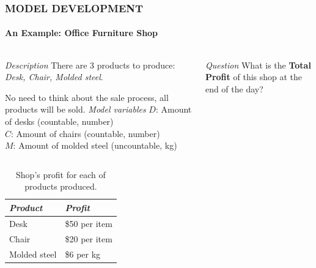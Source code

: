 \documentclass[14 pt]{beamer}
\begin{document}

\begin{frame}[t]
\frametitle{MODEL DEVELOPMENT}
\framesubtitle{An Example: Office Furniture Shop}

\begin{columns}[t]
\begin{column}{0.45\textwidth}
\emph{Description}
\vskip0.5cm%
There are 3 products to produce: \emph{Desk, Chair, Molded steel}.

No need to think about the sale process, all products will be sold.
\vskip0.5cm%
\emph{Model variables}
\vskip0.5cm%
$D$: Amount of desks (countable, number)\\
$C$: Amount of chairs (countable, number)\\
$M$: Amount of molded steel (uncountable, kg)
\end{column}
\begin{column}{0.45\textwidth}
\emph{Question}
\vskip0.5cm%
What is the \textbf{Total Profit} of this shop at the end of the day?
\end{column}
\end{columns}
\vskip1.5cm%
\begin{table}
\begin{tabular}{p{4cm}p{4cm}}
  \hline
  \emph{Product} & \emph{Profit} \\
  \hline
  Desk  & \$50 per item \\
  Chair & \$20 per item \\
  Molded steel & \$6 per kg \\
  \hline
\end{tabular}

\caption{Shop's profit for each of products produced.}  
\end{table}

\end{frame}

\end{document}
